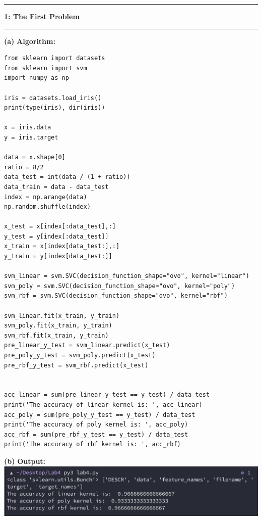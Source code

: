 \documentclass[11pt]{article}
\newcommand\question[2]{\vspace{.25in}\hrule\textbf{#1: #2}\vspace{.5em}\hrule\vspace{.10in}}
\renewcommand\part[1]{\vspace{.10in}\textbf{(#1)}}
\newcommand\algorithm{\vspace{.10in}\textbf{Algorithm: }}
\newcommand\correctness{\vspace{.10in}\textbf{Output: }}
\begin{document}
\raggedright
\newcommand\NAME{Yao Xiao}  %
\newcommand\ANDREWID{2019180015}     %
\newcommand\HWNUM{4}              %


\question{1}{The First Problem} 

\part{a} \algorithm
\begin{lstlisting}
from sklearn import datasets
from sklearn import svm
import numpy as np

iris = datasets.load_iris()
print(type(iris), dir(iris))

x = iris.data
y = iris.target

data = x.shape[0]
ratio = 8/2
data_test = int(data / (1 + ratio))
data_train = data - data_test
index = np.arange(data)
np.random.shuffle(index)

x_test = x[index[:data_test],:] 
y_test = y[index[:data_test]]
x_train = x[index[data_test:],:] 
y_train = y[index[data_test:]]

svm_linear = svm.SVC(decision_function_shape="ovo", kernel="linear")
svm_poly = svm.SVC(decision_function_shape="ovo", kernel="poly")
svm_rbf = svm.SVC(decision_function_shape="ovo", kernel="rbf")

svm_linear.fit(x_train, y_train)
svm_poly.fit(x_train, y_train)
svm_rbf.fit(x_train, y_train)
pre_linear_y_test = svm_linear.predict(x_test)
pre_poly_y_test = svm_poly.predict(x_test)
pre_rbf_y_test = svm_rbf.predict(x_test)


acc_linear = sum(pre_linear_y_test == y_test) / data_test
print('The accuracy of linear kernel is: ', acc_linear)
acc_poly = sum(pre_poly_y_test == y_test) / data_test
print('The accuracy of poly kernel is: ', acc_poly)
acc_rbf = sum(pre_rbf_y_test == y_test) / data_test
print('The accuracy of rbf kernel is: ', acc_rbf)
\end{lstlisting}

\part{b} \correctness\\
\includegraphics[scale=0.8]{ot.png}
\end{document}
